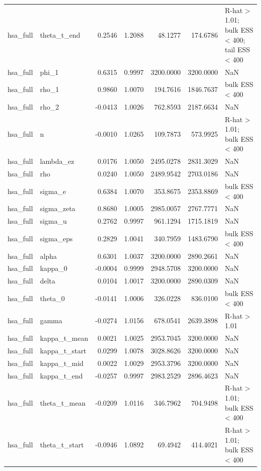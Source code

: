 \begin{tabular}{llrrrrl}
hsa\_full & theta\_t\_end & 0.2546 & 1.2088 & 48.1277 & 174.6786 & R-hat > 1.01; bulk ESS < 400; tail ESS < 400 \\
hsa\_full & phi\_1 & 0.6315 & 0.9997 & 3200.0000 & 3200.0000 & NaN \\
hsa\_full & rho\_1 & 0.9860 & 1.0070 & 194.7616 & 1846.7637 & bulk ESS < 400 \\
hsa\_full & rho\_2 & -0.0413 & 1.0026 & 762.8593 & 2187.6634 & NaN \\
hsa\_full & n & -0.0010 & 1.0265 & 109.7873 & 573.9925 & R-hat > 1.01; bulk ESS < 400 \\
hsa\_full & lambda\_ez & 0.0176 & 1.0050 & 2495.0278 & 2831.3029 & NaN \\
hsa\_full & rho & 0.0240 & 1.0050 & 2489.9542 & 2703.0186 & NaN \\
hsa\_full & sigma\_e & 0.6384 & 1.0070 & 353.8675 & 2353.8869 & bulk ESS < 400 \\
hsa\_full & sigma\_zeta & 0.8680 & 1.0005 & 2985.0057 & 2767.7771 & NaN \\
hsa\_full & sigma\_u & 0.2762 & 0.9997 & 961.1294 & 1715.1819 & NaN \\
hsa\_full & sigma\_eps & 0.2829 & 1.0041 & 340.7959 & 1483.6790 & bulk ESS < 400 \\
hsa\_full & alpha & 0.6301 & 1.0037 & 3200.0000 & 2890.2661 & NaN \\
hsa\_full & kappa\_0 & -0.0004 & 0.9999 & 2948.5708 & 3200.0000 & NaN \\
hsa\_full & delta & 0.0104 & 1.0017 & 3200.0000 & 2890.0309 & NaN \\
hsa\_full & theta\_0 & -0.0141 & 1.0006 & 326.0228 & 836.0100 & bulk ESS < 400 \\
hsa\_full & gamma & -0.0274 & 1.0156 & 678.0541 & 2639.3898 & R-hat > 1.01 \\
hsa\_full & kappa\_t\_mean & 0.0021 & 1.0025 & 2953.7045 & 3200.0000 & NaN \\
hsa\_full & kappa\_t\_start & 0.0299 & 1.0078 & 3028.8626 & 3200.0000 & NaN \\
hsa\_full & kappa\_t\_mid & 0.0022 & 1.0029 & 2953.3796 & 3200.0000 & NaN \\
hsa\_full & kappa\_t\_end & -0.0257 & 0.9997 & 2983.2529 & 2896.4623 & NaN \\
hsa\_full & theta\_t\_mean & -0.0209 & 1.0116 & 346.7962 & 704.9498 & R-hat > 1.01; bulk ESS < 400 \\
hsa\_full & theta\_t\_start & -0.0946 & 1.0892 & 69.4942 & 414.4021 & R-hat > 1.01; bulk ESS < 400 \\

\end{tabular}
